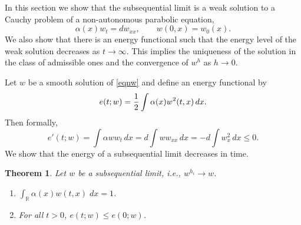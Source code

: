 \documentclass[a4paper,11pt]{article}
\def\R{\mathbb{R}}
\newtheorem{theorem}{Theorem}
\theoremstyle{remark}
\begin{document}
In this section we show that the subsequential limit is a weak solution to a
Cauchy problem of a non-autonomous parabolic equation,
\begin{equation}\label{eqnw}
  \alpha(x) w_t = d w_{xx},\qquad w(0,x)=w_0(x).
\end{equation}
We also show that there is an energy functional such that the energy level of the weak solution decreases as $t\to\infty$. This implies the uniqueness of the solution in the class of admissible ones and the convergence of $w^h$ as $h\to0$.

Let $w$ be a smooth solution of \eqref{eqnw} and define an energy
functional by
$$
e(t;w)={1\over 2}\int \alpha(x) w^2(t,x)\,dx.
$$
Then formally,
$$
e'(t;w)=\int \alpha ww_t\,dx=d\int ww_{xx}\,dx=-d\int w_x^2\,dx\le 0.
$$
We show that the energy of a subsequential limit decreases in time.
\begin{theorem}
Let $w$ be a subsequential limit, i.e., $w^{h_i}\to w$.
\begin{enumerate}
 \item  $\int_\R\alpha(x) w(t,x)\;dx = 1$.
 \item For all $t>0$, $e(t;w)\le e(0;w)$.
\end{enumerate}
\end{theorem}
\end{document}
